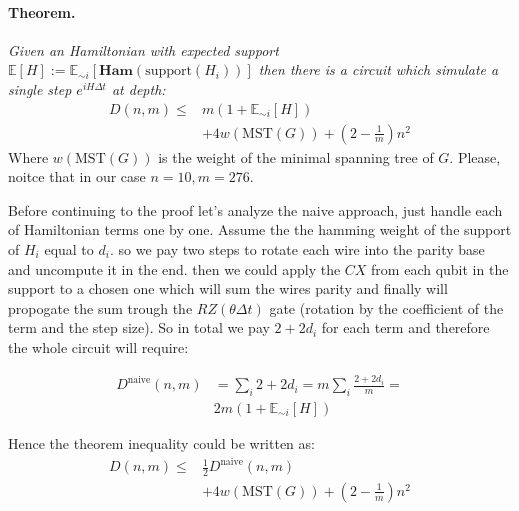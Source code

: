 \documentclass{article}
\begin{document}
\paragraph{Theorem.}  \textit{ Given an Hamiltonian with expected support \(\mathbb{E}[H] := \mathbb{E}_{\sim i}\left[ \textbf{Ham}( \text{support}(H_i)) \right]\) then there is a circuit which simulate a single step \(e^{iH \Delta t}\) at depth:}
\begin{equation*}
  \begin{split}
    D\left(n,m\right) \leq & m \left( 1 + \mathbb{E}_{\sim i}[H] \right)   \\
    & + 4w \left( \text{MST}\left(G\right) \right) + \left(2 - \frac{1}{m}\right)n^2
  \end{split}    
\end{equation*}  Where  \(w \left( \text{MST}\left(G\right) \right) \) is the weight of the minimal spanning tree of \(G\). Please, noitce that in our case \(n=10, m=276\).

Before continuing to the proof let's analyze the naive approach, just handle each of Hamiltonian terms one by one. Assume the the hamming weight of the support of \(H_i\) equal to \(d_i\). so we pay two steps to rotate each wire into the parity base and uncompute it in the end. then we could apply the \(CX\) from each qubit in the support to a chosen one which will sum the wires parity and finally will propogate the sum trough the \(RZ\left(\theta \Delta t \right) \) gate (rotation by the coefficient of the term and the step size). So in total we pay \(2 + 2d_i\) for each term and therefore the whole circuit will require: 

\begin{equation*}
  \begin{split}
    D^{\text{naive}}\left(n,m\right) & = \sum_{i}{2 + 2d_i} = m\sum_{i}{\frac{2 + 2d_i}{m}} = \\ & 2m \left( 1 + \mathbb{E}_{\sim i}[H] \right)  
  \end{split}
\end{equation*}

Hence the theorem inequality could be written as:
\begin{equation*}
  \begin{split}
    D\left(n,m\right) \leq & \frac{1}{2} D^{\text{naive}} \left(n,m\right) \\ & + 4w \left( \text{MST}\left(G\right) \right) + \left(2 - \frac{1}{m}\right)n^2
  \end{split}    
\end{equation*} 
\end{document}
